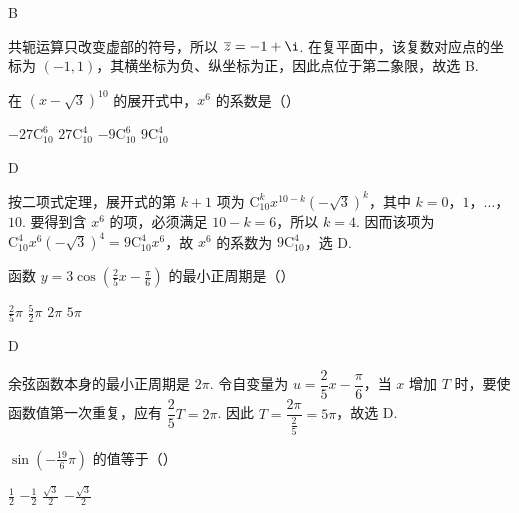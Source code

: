 \begin{answer}
B
\end{answer}

\begin{solution}
共轭运算只改变虚部的符号，所以
\(\overline z=-1+\i\). 在复平面中，该复数对应点的坐标为 \((-1,1)\)，其横坐标为负、纵坐标为正，因此点位于第二象限，故选 B.
\end{solution}

\begin{problem}
在 \(\left(x-\sqrt{3}\right)^{10}\) 的展开式中，\(x^6\) 的系数是（\quad）

\choices
    {\(-27\mathrm C_{10}^6\)}
    {\(27\mathrm C_{10}^4\)}
    {\(-9\mathrm C_{10}^6\)}
    {\(9\mathrm C_{10}^4\)}
\end{problem}

\begin{answer}
D
\end{answer}

\begin{solution}
按二项式定理，展开式的第 \(k+1\) 项为
\(\mathrm C_{10}^k x^{10-k}\left(-\sqrt{3}\right)^k\)，其中 \(k=0\)，\(1\)，\(\ldots\)，\(10\). 要得到含 \(x^6\) 的项，必须满足 \(10-k=6\)，所以 \(k=4\). 因而该项为
\(\mathrm C_{10}^4x^6\left(-\sqrt{3}\right)^4=9\mathrm C_{10}^4x^6\)，故 \(x^6\) 的系数为 \(9\mathrm C_{10}^4\)，选 D.
\end{solution}

\begin{problem}
函数 \(y = 3\cos\left(\frac{2}{5}x-\frac{\pi}{6}\right)\) 的最小正周期是（\quad）

\choices
    {\(\frac{2}{5}\pi\)}
    {\(\frac{5}{2}\pi\)}
    {\(2\pi\)}
    {\(5\pi\)}
\end{problem}

\begin{answer}
D
\end{answer}

\begin{solution}
余弦函数本身的最小正周期是 \(2\pi\). 令自变量为
\(u=\dfrac25x-\dfrac\pi6\)，当 \(x\) 增加 \(T\) 时，要使函数值第一次重复，应有 \(\dfrac25T=2\pi\). 因此
\(T=\dfrac{2\pi}{\frac25}=5\pi\)，故选 D.
\end{solution}

\begin{problem}
\(\sin\left(-\frac{19}{6}\pi\right)\) 的值等于（\quad）

\choices
    {\(\frac{1}{2}\)}
    {\(-\frac{1}{2}\)}
    {\(\frac{\sqrt{3}}{2}\)}
    {\(-\frac{\sqrt{3}}{2}\)}
\end{problem}


